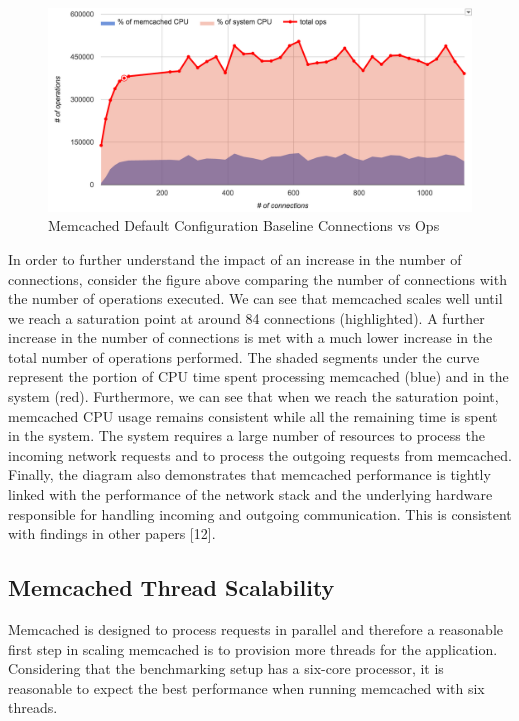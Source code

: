 \begin{figure}[h]
    \includegraphics[width=\textwidth]{./res/5_baseline_connections_vs_ops.png}
    \caption{Memcached Default Configuration Baseline Connections vs Ops}
    \label{fig:memcached-default-connections-vs-ops}
\end{figure}

In order to further understand the impact of an increase in the number of connections, consider the figure above comparing the number of connections with the number of operations executed. We can see that memcached scales well until we reach a saturation point at around 84 connections (highlighted). A further increase in the number of connections is met with a much lower increase in the total number of operations performed. The shaded segments under the curve represent the portion of CPU time spent processing memcached (blue) and in the system (red). Furthermore, we can see that when we reach the saturation point, memcached CPU usage remains consistent while all the remaining time is spent in the system. The system requires a large number of resources to process the incoming network requests and to process the outgoing requests from memcached. Finally, the diagram also demonstrates that memcached performance is tightly linked with the performance of the network stack and the underlying hardware responsible for handling incoming and outgoing communication. This is consistent with findings in other papers [12].

\subsection{Memcached Thread Scalability}
Memcached is designed to process requests in parallel and therefore a reasonable first step in scaling memcached is to provision more threads for the application. Considering that the benchmarking setup has a six-core processor, it is reasonable to expect the best performance when running memcached with six threads.

